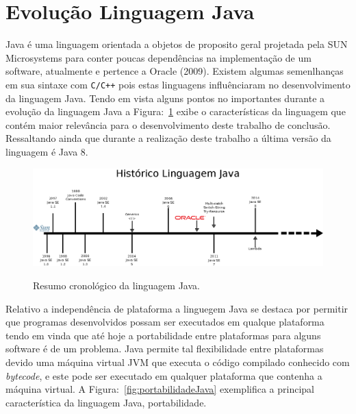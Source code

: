  
\section{Evolu\c{c}\~{a}o Linguagem Java}\label{sec:evolucaoJava}

Java \'{e} uma linguagem orientada a objetos de proposito geral projetada pela SUN Microsystems para conter poucas depend\^{e}ncias na implementa\c{c}\~{a}o de um software, atualmente e pertence a Oracle (2009). Existem algumas semenlhan\c{c}as em sua sintaxe com \texttt{C/C++} pois estas linguagens influ\^{e}nciaram no desenvolvimento da linguagem Java. Tendo em vista alguns pontos no importantes durante a evolu\c{c}\~{a}o da linguagem Java a Figura:~\ref{fig:timeLineJava} exibe o caracter\'{i}sticas da linguagem que cont\'{e}m  maior relev\^{a}ncia para o desenvolvimento deste trabalho de conclus\~{a}o. Ressaltando ainda que durante a realiza\c{c}\~{a}o deste trabalho a \'{u}ltima vers\~{a}o  da linguagem \'{e} Java 8.

\begin{figure}[h]
	\center
	\includegraphics[scale=1]{Imagens/timeLineJava}
	\label{fig:timeLineJava}
	\caption{Resumo cronol\'{o}gico da linguagem Java.}
\end{figure}

Relativo a independ\^{e}ncia de plataforma a linguegem Java se destaca por permitir que programas desenvolvidos possam ser executados em qualque plataforma tendo em vinda que at\'{e} hoje a portabilidade entre plataformas para alguns software \'{e} de um problema. Java permite tal flexibilidade entre plataformas devido uma m\'{a}quina virtual \acs{JVM} que executa o c\'{o}digo compilado conhecido com \textit{bytecode}, e este pode ser executado em qualquer plataforma que contenha a m\'{a}quina virtual. A Figura:~\ref{fig:portabilidadeJava} exemplifica a principal caracter\'{i}stica da linguagem Java, portabilidade.


